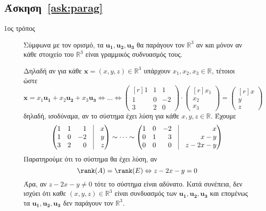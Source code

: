 \subsection*{Άσκηση~\ref{ask:parag}} 

\begin{description}
  \item[1ος τρόπος] 
    Σύμφωνα με τον ορισμό, τα $ \mathbf{u_{1}}, \mathbf{u_{2}}, \mathbf{u_{3}} $ θα 
    παράγουν τον $ \mathbb{R}^{3} $ αν και μόνον αν \textcolor{Col1}{κάθε} στοιχείο του 
    $ \mathbb{R}^{3} $ είναι γραμμικός συδνυασμός τους.

    Δηλαδή αν για κάθε $ \mathbf{x} = (x,y,z) \in \mathbb{R}^{3} $  υπάρχουν 
    $ x_{1}, x_{2}, x_{3} \in \mathbb{R} $, τέτοιοι ώστε
    \[
      \mathbf{x} = x_{1} \mathbf{u_{1}}+ x_{2} \mathbf{u_{2}}+ x_{3} \mathbf{u_{3}}
      \Leftrightarrow \ldots \Leftrightarrow 
      \begin{pmatrix*}[r]
        1 & 1 & 1 \\
        1 & 0 & -2 \\
        3 & 2 & 0
      \end{pmatrix*} \cdot 
      \begin{pmatrix*}[r] x_{1} \\ x_{2} \\ x_{3} \end{pmatrix*} = 
      \begin{pmatrix*}[r] x \\ y \\ z \end{pmatrix*}
    \] 
    δηλαδή, ισοδύναμα, αν το σύστημα έχει λύση για \textcolor{Col1}{κάθε} 
    $x,y,z \in \mathbb{R}$. Έχουμε
    \[
      \begin{pmatrix*}[r]
        1 & 1 & 1 & \vrule & x \\
        1 & 0 & -2 & \vrule & y \\
        3 & 2 & 0 & \vrule & z
      \end{pmatrix*} \sim \cdots \sim 
      \begin{pmatrix*}[r]
        1 & 0 & -2 & \vrule & x \\
        0 & 1 & 3 & \vrule & x - y \\
        0 & 0 & 0 & \vrule & z - 2x -y 
      \end{pmatrix*}
    \] 
    Παρατηρούμε ότι το σύστημα θα έχει λύση, αν
    \[
      \rank(A) = \rank(E) \Leftrightarrow z-2x-y=0
    \] 
    Άρα, αν $ z-2x-y \neq 0 $ τότε το σύστημα είναι αδύνατο. Κατά συνέπεια, δεν ισχύει 
    ότι καθε $ (x,y,z) \in \mathbb{R}^{3} $ είναι συνδυασμός των $ \mathbf{u_{1}},
    \mathbf{u_{2}}, \mathbf{u_{3}} $ και επομένως τα $ \mathbf{u_{1}}, \mathbf{u_{2}},
    \mathbf{u_{3}} $ δεν παράγουν τον $ \mathbb{R}^{3} $.


\end{description}
